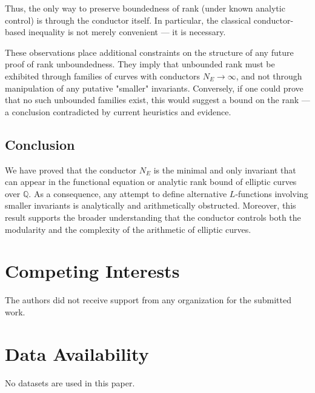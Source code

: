 \documentclass[a4paper,11pt]{article}
\theoremstyle{thmstyleone}%
\theoremstyle{thmstyletwo}%
\theoremstyle{thmstylethree}%
\begin{document}
	Thus, the only way to preserve boundedness of rank (under known analytic control) is through the conductor itself. In particular, the classical conductor-based inequality is not merely convenient — it is necessary.
	
	These observations place additional constraints on the structure of any future proof of rank unboundedness. They imply that unbounded rank must be exhibited through families of curves with conductors \( N_E \to \infty \), and not through manipulation of any putative "smaller" invariants. Conversely, if one could prove that no such unbounded families exist, this would suggest a bound on the rank — a conclusion contradicted by current heuristics and evidence.
	
	\subsection*{Conclusion}
	
	We have proved that the conductor \( N_E \) is the minimal and only invariant that can appear in the functional equation or analytic rank bound of elliptic curves over \( \mathbb{Q} \). As a consequence, any attempt to define alternative \( L \)-functions involving smaller invariants is analytically and arithmetically obstructed. Moreover, this result supports the broader understanding that the conductor controls both the modularity and the complexity of the arithmetic of elliptic curves.

	\section*{Competing Interests}
	The authors did not receive support from any organization for the submitted work.
	
	\section*{Data Availability}
	No datasets are used in this paper.
		
	
	
\end{document}
